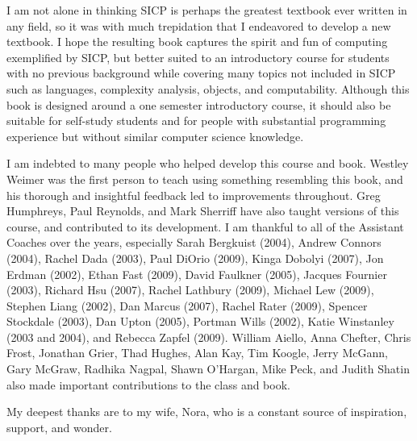 \thispagestyle{plain}
I am not alone in thinking SICP is perhaps the greatest textbook ever written in any field, so it was with much trepidation that I endeavored to develop a new textbook. I hope the resulting book captures the spirit and fun of computing exemplified by SICP, but better suited to an introductory course for students with no previous background while covering many topics not included in SICP such as languages, complexity analysis, objects, and computability.  Although this book is designed around a one semester introductory course, it should also be suitable for self-study students and for people with substantial programming experience but without similar computer science knowledge.

I am indebted to many people who helped develop this course and book.  Westley Weimer was the first person to teach using something resembling this book, and his thorough and insightful feedback led to improvements throughout.  Greg Humphreys, Paul Reynolds, and Mark Sherriff have also taught versions of this course, and contributed to its development.  I am thankful to all of the Assistant Coaches over the years, especially 
Sarah Bergkuist (2004),
Andrew Connors (2004),
Rachel Dada (2003),
Paul DiOrio (2009),
Kinga Dobolyi (2007),
Jon Erdman (2002),  
Ethan Fast (2009),
David Faulkner (2005),
Jacques Fournier (2003),
Richard Hsu (2007),
Rachel Lathbury (2009),
Michael Lew (2009),
Stephen Liang (2002), 
Dan Marcus (2007),
Rachel Rater (2009),
Spencer Stockdale (2003), 
Dan Upton (2005),
Portman Wills (2002),
Katie Winstanley (2003 and 2004),
and Rebecca Zapfel (2009).
William Aiello, Anna Chefter, Chris Frost, Jonathan Grier, Thad Hughes, Alan Kay, Tim Koogle, Jerry McGann, Gary McGraw, Radhika Nagpal, Shawn O'Hargan, Mike Peck, and Judith Shatin also made important contributions to the class and book.    


My deepest thanks are to my wife, Nora, who is a constant source of inspiration, support, and wonder.

